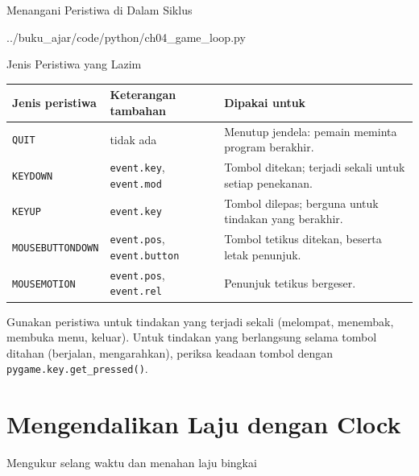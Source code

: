 \documentclass[aspectratio=169,10pt]{beamer}
\begin{document}
\begin{frame}[fragile]{Menangani Peristiwa di Dalam Siklus}

  {../buku_ajar/code/python/ch04_game_loop.py}
\end{frame}

\begin{frame}{Jenis Peristiwa yang Lazim}
{\scriptsize
\renewcommand{\arraystretch}{1.12}
\begin{tabularx}{\textwidth}{@{}>{\raggedright\arraybackslash}p{3.0cm}
    >{\raggedright\arraybackslash}p{3.9cm}
    >{\raggedright\arraybackslash}X@{}}
\toprule
\textbf{Jenis peristiwa} & \textbf{Keterangan tambahan} & \textbf{Dipakai untuk} \\
\midrule
\texttt{QUIT} & tidak ada &
  Menutup jendela: pemain meminta program berakhir. \\
\texttt{KEYDOWN} & \texttt{event.key}, \texttt{event.mod} &
  Tombol ditekan; terjadi sekali untuk setiap penekanan. \\
\texttt{KEYUP} & \texttt{event.key} &
  Tombol dilepas; berguna untuk tindakan yang berakhir. \\
\texttt{MOUSEBUTTONDOWN} & \texttt{event.pos}, \texttt{event.button} &
  Tombol tetikus ditekan, beserta letak penunjuk. \\
\texttt{MOUSEMOTION} & \texttt{event.pos}, \texttt{event.rel} &
  Penunjuk tetikus bergeser. \\
\bottomrule
\end{tabularx}}
\vfill
\begin{kotak}
Gunakan peristiwa untuk tindakan yang terjadi sekali (melompat, menembak,
membuka menu, keluar). Untuk tindakan yang berlangsung selama tombol ditahan
(berjalan, mengarahkan), periksa keadaan tombol dengan
\texttt{pygame.key.get\_pressed()}.
\end{kotak}
\end{frame}

\section{Mengendalikan Laju dengan Clock}
  {Mengukur selang waktu dan menahan laju bingkai}
\end{document}
